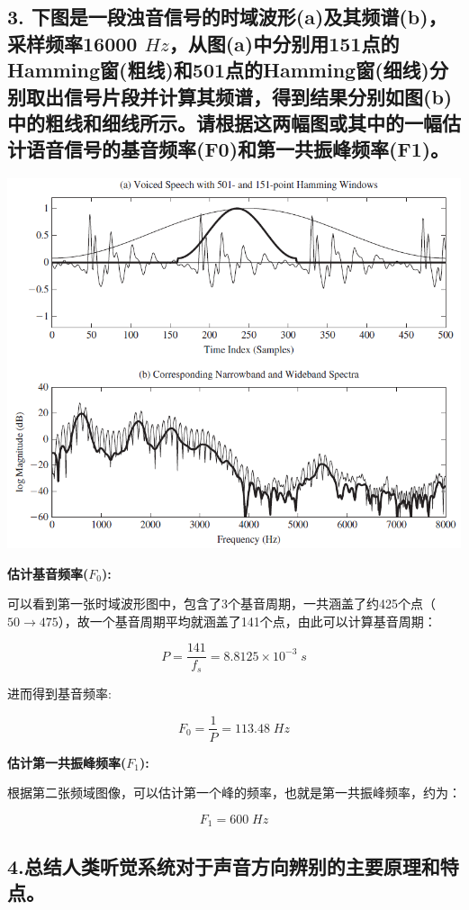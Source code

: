 \documentclass[]{article}
\begin{document}
\hypertarget{header-n94}{%
\subsection{3.	下图是一段浊音信号的时域波形(a)及其频谱(b)，采样频率16000 $Hz$，从图(a)中分别用151点的Hamming窗(粗线)和501点的Hamming窗(细线)分别取出信号片段并计算其频谱，得到结果分别如图(b)中的粗线和细线所示。请根据这两幅图或其中的一幅估计语音信号的基音频率(F0)和第一共振峰频率(F1)。}\label{header-n94}}

\centerline{\includegraphics[scale=.75]{figures/q3.png}}

\textbf{估计基音频率($F_0$):}

可以看到第一张时域波形图中，包含了3个基音周期，一共涵盖了约425个点（$50\rightarrow 475$），故一个基音周期平均就涵盖了141个点，由此可以计算基音周期：

$$P=\frac{141}{f_s}=8.8125\times 10^{-3}\;s$$

进而得到基音频率:

$$F_0=\frac{1}{P}=113.48\;Hz$$

\textbf{估计第一共振峰频率($F_1$):}

根据第二张频域图像，可以估计第一个峰的频率，也就是第一共振峰频率，约为：

$$F_1=600\;Hz$$

\hypertarget{header-n102}{%
\subsection{4.总结人类听觉系统对于声音方向辨别的主要原理和特点。}\label{header-n102}}
\end{document}
